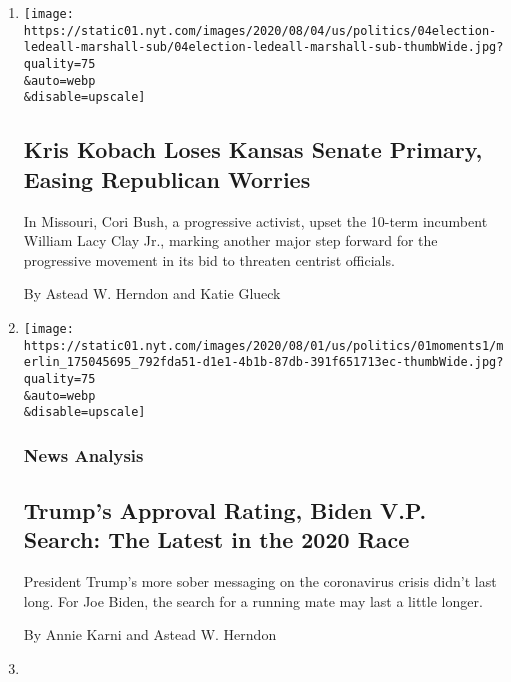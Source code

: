 \begin{enumerate}
\def\labelenumi{\arabic{enumi}.}
\item
  \href{/2020/08/04/us/politics/kobach-tlaib.html}{}

  \texttt{[image: https://static01.nyt.com/images/2020/08/04/us/politics/04election-ledeall-marshall-sub/04election-ledeall-marshall-sub-thumbWide.jpg?quality=75\\\&auto=webp\\\&disable=upscale]}

  \hypertarget{kris-kobach-loses-kansas-senate-primary-easing-republican-worries}{%
  \subsection{Kris Kobach Loses Kansas Senate Primary, Easing Republican
  Worries}\label{kris-kobach-loses-kansas-senate-primary-easing-republican-worries}}

  In Missouri, Cori Bush, a progressive activist, upset the 10-term
  incumbent William Lacy Clay Jr., marking another major step forward
  for the progressive movement in its bid to threaten centrist
  officials.

  By Astead W. Herndon and Katie Glueck
\item
  \href{/2020/08/01/us/politics/trump-biden-polls-vp.html}{}

  \texttt{[image: https://static01.nyt.com/images/2020/08/01/us/politics/01moments1/merlin\_175045695\_792fda51-d1e1-4b1b-87db-391f651713ec-thumbWide.jpg?quality=75\\\&auto=webp\\\&disable=upscale]}

  \hypertarget{news-analysis}{%
  \subsubsection{News Analysis}\label{news-analysis}}

  \hypertarget{trumps-approval-rating-biden-vp-search-the-latest-in-the-2020-race}{%
  \subsection{Trump's Approval Rating, Biden V.P. Search: The Latest in
  the 2020
  Race}\label{trumps-approval-rating-biden-vp-search-the-latest-in-the-2020-race}}

  President Trump's more sober messaging on the coronavirus crisis
  didn't last long. For Joe Biden, the search for a running mate may
  last a little longer.

  By Annie Karni and Astead W. Herndon
\item
  \href{/2020/07/25/us/politics/trump-biden-polls-coronavirus.html}{}


\end{enumerate}
